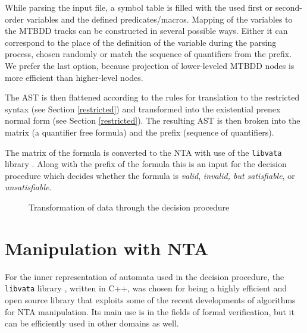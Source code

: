 While parsing the input file, a symbol table is filled with the used
first or second-order variables and the defined predicates/macros. Mapping of
the variables to the MTBDD tracks can be constructed in several possible ways.
Either it can correspond to the place of the definition of the variable during
the parsing process, chosen randomly or match the sequence of quantifiers from
the prefix. We prefer the last option, because projection of lower-leveled MTBDD
nodes is more efficient than higher-level nodes.

The AST is then flattened according to the rules for translation to
the restricted syntax (see Section \ref{restricted}) and transformed into
the existential prenex normal form (see Section \ref{restricted}). The resulting
AST is then broken into the matrix (a quantifier free formula) and the
prefix (sequence of quantifiers).

The matrix of the formula is converted to the NTA
with use of the \texttt{libvata} library
\cite{vata-tool}.
Along with the prefix of the formula this is an input for the decision procedure
which decides whether the formula is \emph{valid}, \emph{invalid, but
satisfiable}, or \emph{unsatisfiable}.

\begin{figure}[hb]
\begin{center}
 \caption{Transformation of data through the decision procedure}\label{flow}
 \end{center}
\end{figure}

\section{Manipulation with NTA}

For the inner representation of automata used in the decision procedure, the
\texttt{libvata} library \cite{vata-tool}, written in C++, was chosen for being
a highly efficient and open source library that exploits some of the recent
developments of algorithms for NTA manipulation. Its main use is in the fields
of formal verification, but it can be efficiently used in other domains as well.

